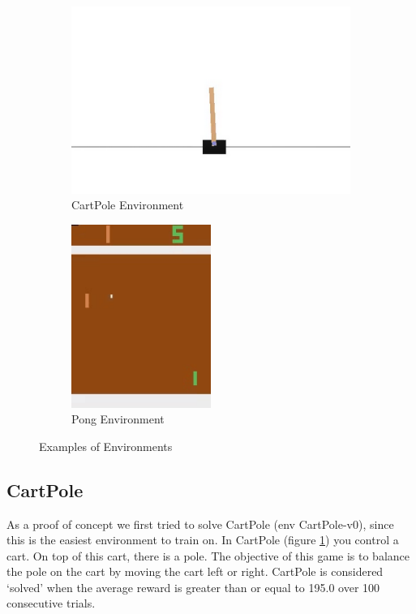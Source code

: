 \documentclass{article}
\begin{document}
\begin{figure}[H]
\centering
\begin{subfigure}{0.45\textwidth}
\centering
\includegraphics[width=\textwidth]{images/cartpole.PNG}
\caption{CartPole Environment}
\label{fig:cartpole}
\end{subfigure}
\begin{subfigure}{0.45\textwidth}
\centering
\includegraphics[width=0.5\textwidth]{images/pong.png}
\caption{Pong Environment}
\label{fig:pong}
\end{subfigure}
\caption{Examples of Environments}
\end{figure}

\subsection{CartPole}
As a proof of concept we first tried to solve CartPole (env CartPole-v0), since this is the easiest environment to train on. In CartPole (figure \ref{fig:cartpole}) you control a cart. On top of this cart, there is a pole. The objective of this game is to balance the pole on the cart by moving the cart left or right. CartPole is considered `solved' when the average reward is greater than or equal to 195.0 over 100 consecutive trials.
\end{document}
